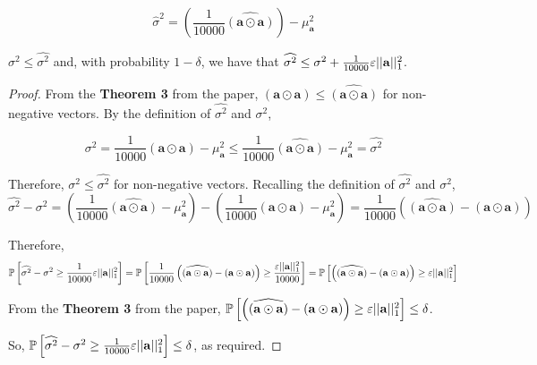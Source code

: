 \begin{equation}
    \widehat{\sigma}^2=\left(\frac{1}{10000}\widehat{(\mathbf{a}\odot\mathbf{a})}\right)-\mu_{\mathbf{a}}^2
\end{equation}

\begin{theorem}
\label{th:cm_var}
$\sigma^2\leq\widehat{\sigma^2}$ and, with probability $1-\delta$, we have that $\widehat{\sigma^2}\leq\sigma^2 + \frac{1}{10000}\varepsilon\lvert\lvert {\mathbf{a}} \rvert\rvert_1^2$.
\end{theorem}

\begin{proof}
From the \textbf{Theorem 3} from the \cite{cm-sketch} paper, $(\mathbf{a}\odot\mathbf{a})\leq\widehat{(\mathbf{a}\odot\mathbf{a})}$ for non-negative vectors. By the definition of $\widehat{\sigma^2}$ and $\sigma^2$,

\begin{equation}
    \sigma^2=\frac{1}{10000}(\mathbf{a}\odot\mathbf{a})-\mu_{\mathbf{a}}^2\leq\frac{1}{10000}\widehat{(\mathbf{a}\odot\mathbf{a})}-\mu_{\mathbf{a}}^2=\widehat{\sigma^2}    
\end{equation}

\noindent Therefore, $\sigma^2\leq\widehat{\sigma^2}$ for non-negative vectors. Recalling the definition of $\widehat{\sigma^2}$ and $\sigma^2$,
\begin{equation}
    \widehat{\sigma^2} - \sigma^2 = \left(\frac{1}{10000}\widehat{(\mathbf{a}\odot\mathbf{a})}-\mu_{\mathbf{a}}^2\right) - \left(\frac{1}{10000}(\mathbf{a}\odot\mathbf{a})-\mu_{\mathbf{a}}^2\right) = \frac{1}{10000}\left(\widehat{(\mathbf{a}\odot\mathbf{a})} - (\mathbf{a}\odot\mathbf{a})\right)
\end{equation}

\noindent Therefore,
\begin{equation}
    \mathbb{P}\left[\widehat{\sigma^2} - \sigma^2 \geq \frac{1}{10000}\varepsilon\lvert\lvert {\mathbf{a}} \rvert\rvert_1^2\right] = \mathbb{P}\left[\frac{1}{10000}\left(\widehat{(\mathbf{a}\odot\mathbf{a})} - (\mathbf{a}\odot\mathbf{a})\right) \geq \frac{\varepsilon\lvert\lvert {\mathbf{a}} \rvert\rvert_1^2}{10000}\right] = \mathbb{P}\left[\left(\widehat{(\mathbf{a}\odot\mathbf{a})} - (\mathbf{a}\odot\mathbf{a})\right) \geq \varepsilon\lvert\lvert {\mathbf{a}} \rvert\rvert_1^2\right]
\end{equation}

\noindent From the \textbf{Theorem 3} from the \cite{cm-sketch} paper, $\mathbb{P}\left[\left(\widehat{(\mathbf{a}\odot\mathbf{a})} - (\mathbf{a}\odot\mathbf{a})\right) \geq \varepsilon\lvert\lvert {\mathbf{a}} \rvert\rvert_1^2\right]\leq\delta$. 

\noindent So, $\mathbb{P}\left[\widehat{\sigma^2} - \sigma^2 \geq \frac{1}{10000}\varepsilon\lvert\lvert {\mathbf{a}} \rvert\rvert_1^2\right]\leq\delta$, as required.
\end{proof}

